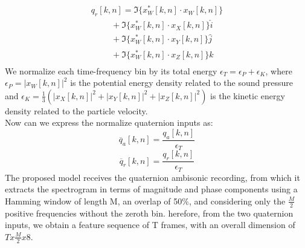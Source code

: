 \documentclass{article}
\begin{document}
    \begin{equation*}
        \begin{matrix}
            q_r[k,n]=\Im\{x_W^*[k,n]\cdot x_W[k,n]\} \\
            \hspace{1cm} + \Im\{x_W^*[k,n]\cdot x_X[k,n]\}\hat{i} \\
            \hspace{1cm} + \Im\{x_W^*[k,n] \cdot x_Y[k,n]\}\hat{j} \\
            \hspace{1cm} + \Im\{x_W^*[k,n]\cdot x_Z[k,n]\}\hat{k} \\
        \end{matrix}
    \end{equation*}
    We normalize each time-frequency bin by its total energy $\epsilon_T=\epsilon_P+\epsilon_K$, where $\epsilon_P=|x_W[k, n]|^2$ 
    is the potential energy density related to the sound pressure and $\epsilon_K=\frac{1}{3}(|x_X[k, n]|^2+|x_Y[k, n]|^2+|x_Z[k, n]|^2)$ 
    is the kinetic energy density related to the particle velocity.
    \\ Now can we express the normalize quaternion inputs as:
    \begin{equation*}
        \overline{q}_a [k,n] = \frac{q_a[k,n]}{\epsilon_T} 
    \end{equation*}
    \begin{equation*}
        \overline{q}_r [k,n] = \frac{q_r[k,n]}{\epsilon_T} 
    \end{equation*}
    The proposed model receives the quaternion ambisonic recording, from which it extracts the spectrogram in terms of magnitude and phase
    components using a Hamming window of length M, an overlap of 50\%, and considering only the $\frac{M}{2}$ positive frequencies without the 
    zeroth bin. herefore, from the two quaternion inputs, we obtain a feature sequence of T frames, with an overall dimension of $Tx\frac{M}{2}x8$.
\end{document}
